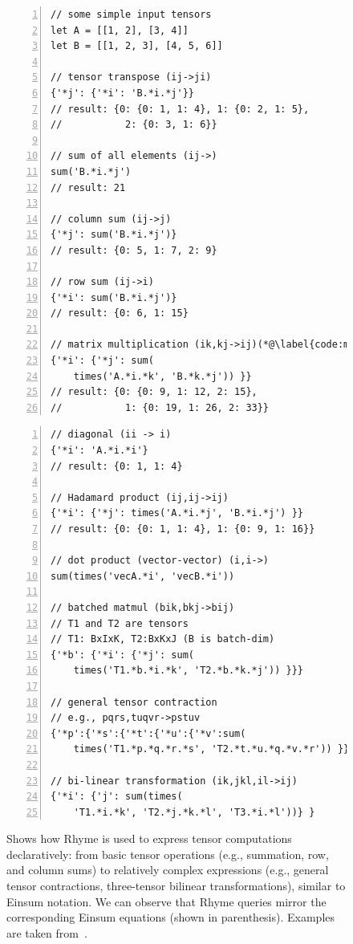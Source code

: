 \documentclass[runningheads]{llncs}
\newcommand{\lang}{Rhyme}
\begin{document}
\begin{figure}[t]
\begin{minipage}{0.5\textwidth}
\begin{lstlisting}[style=JavaScript, columns=flexible, numbers=left]
// some simple input tensors
let A = [[1, 2], [3, 4]]
let B = [[1, 2, 3], [4, 5, 6]]

// tensor transpose (ij->ji)
{'*j': {'*i': 'B.*i.*j'}}
// result: {0: {0: 1, 1: 4}, 1: {0: 2, 1: 5},
//           2: {0: 3, 1: 6}}

// sum of all elements (ij->)
sum('B.*i.*j')
// result: 21

// column sum (ij->j)
{'*j': sum('B.*i.*j')}
// result: {0: 5, 1: 7, 2: 9}

// row sum (ij->i)
{'*i': sum('B.*i.*j')}
// result: {0: 6, 1: 15}

// matrix multiplication (ik,kj->ij)(*@\label{code:matmulquery}@*)
{'*i': {'*j': sum(
    times('A.*i.*k', 'B.*k.*j')) }}
// result: {0: {0: 9, 1: 12, 2: 15},
//           1: {0: 19, 1: 26, 2: 33}}
\end{lstlisting}
\end{minipage}
\begin{minipage}{0.5\textwidth}
\begin{lstlisting}[style=JavaScript, columns=flexible, numbers=left, firstnumber=last]
// diagonal (ii -> i)
{'*i': 'A.*i.*i'}
// result: {0: 1, 1: 4}

// Hadamard product (ij,ij->ij)
{'*i': {'*j': times('A.*i.*j', 'B.*i.*j') }}
// result: {0: {0: 1, 1: 4}, 1: {0: 9, 1: 16}}

// dot product (vector-vector) (i,i->)
sum(times('vecA.*i', 'vecB.*i'))

// batched matmul (bik,bkj->bij)
// T1 and T2 are tensors
// T1: BxIxK, T2:BxKxJ (B is batch-dim)
{'*b': {'*i': {'*j': sum(
    times('T1.*b.*i.*k', 'T2.*b.*k.*j')) }}}

// general tensor contraction
// e.g., pqrs,tuqvr->pstuv
{'*p':{'*s':{'*t':{'*u':{'*v':sum(
    times('T1.*p.*q.*r.*s', 'T2.*t.*u.*q.*v.*r')) }}}}}

// bi-linear transformation (ik,jkl,il->ij)
{'*i': {'j': sum(times(
    'T1.*i.*k', 'T2.*j.*k.*l', 'T3.*i.*l'))} }
\end{lstlisting}
\end{minipage}
\caption{
Shows how \lang{} is used to express tensor computations declaratively:
from basic tensor operations (e.g., summation, row, and column sums) to relatively complex expressions
(e.g., general tensor contractions, three-tensor bilinear transformations), similar
to Einsum notation.
We can observe that \lang{} queries
mirror the corresponding Einsum equations (shown in parenthesis).
Examples are taken from~\cite{einsumblog}.
}\label{fig:tensors}
\end{figure}
\end{document}
